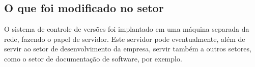\subsection{O que foi modificado no setor}

O sistema de controle de versões foi implantado em uma máquina separada da rede, fazendo o papel de servidor. Este servidor pode eventualmente, além de servir ao setor de desenvolvimento da empresa, servir também a outros setores, como o setor de documentação de software, por exemplo.

